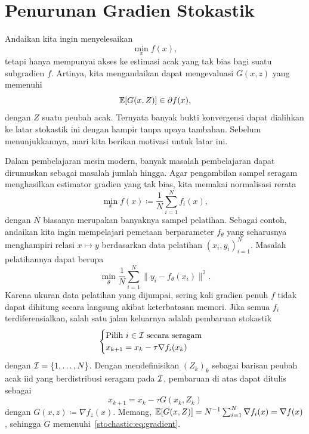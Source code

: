 \chapter{Penurunan Gradien Stokastik}
Andaikan kita ingin menyelesaikan
\begin{equation}
    \min_x f(x),
\end{equation}
tetapi hanya mempunyai akses ke estimasi acak yang tak bias bagi suatu subgradien $f$. Artinya, kita mengandaikan dapat mengevaluasi $G(x,z)$ yang memenuhi
\begin{equation}\label{stochastic:eq:gradient}
    \mathbb{E}[G(x,Z)] \in \partial f(x),
\end{equation}
dengan $Z$ suatu peubah acak.
Ternyata banyak bukti konvergensi dapat dialihkan ke latar stokastik ini dengan hampir tanpa upaya tambahan. Sebelum menunjukkannya, mari kita berikan motivasi untuk latar ini.

Dalam pembelajaran mesin modern, banyak masalah pembelajaran dapat dirumuskan sebagai masalah jumlah hingga. Agar pengambilan sampel seragam menghasilkan estimator gradien yang tak bias, kita memakai normalisasi rerata
\begin{equation}
    \min_x f(x)\coloneqq \frac{1}{N}\sum_{i=1}^N f_i(x),
\end{equation}
dengan $N$ biasanya merupakan banyaknya sampel pelatihan. Sebagai contoh, andaikan kita ingin mempelajari pemetaan berparameter $f_\theta$ yang seharusnya menghampiri relasi $x\mapsto y$ berdasarkan data pelatihan $(x_i,y_i)_{i=1}^N$. Masalah pelatihannya dapat berupa
\begin{equation}
    \min_\theta \frac{1}{N}\sum_{i=1}^N \|y_i-f_\theta(x_i)\|^2.
\end{equation}
Karena ukuran data pelatihan yang dijumpai, sering kali gradien penuh $f$ tidak dapat dihitung secara langsung akibat keterbatasan memori.
Jika semua $f_i$ terdiferensialkan, salah satu jalan keluarnya adalah pembaruan stokastik
\begin{equation}
    \begin{cases}
        \text{Pilih $i\in\mathcal{I}$ secara seragam}\\
        x_{k+1} = x_k - \tau \nabla f_i(x_k)
    \end{cases}
\end{equation}
dengan $\mathcal{I}=\{1,\dots,N\}$.
Dengan mendefinisikan $(Z_k)_k$ sebagai barisan peubah acak iid yang berdistribusi seragam pada $\mathcal{I}$, pembaruan di atas dapat ditulis sebagai
\begin{equation}
    x_{k+1} = x_k - \tau G(x_k,Z_k)
\end{equation}
dengan $G(x,z) \coloneqq \nabla f_z(x)$. Memang,
$\mathbb{E}[G(x,Z)]=N^{-1}\sum_{i=1}^N\nabla f_i(x)=\nabla f(x)$, sehingga $G$ memenuhi~\eqref{stochastic:eq:gradient}.

